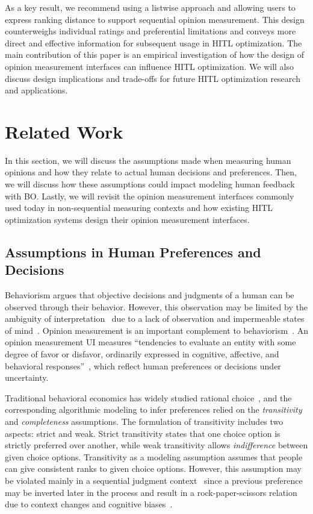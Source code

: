 \documentclass[acmsmall,screen,nonacm]{acmart}
\begin{document}
As a key result, we recommend using a listwise approach and allowing users to express ranking distance to support sequential opinion measurement. This design counterweighs individual ratings and preferential limitations and conveys more direct and effective information for subsequent usage in HITL optimization.
The main contribution of this paper is an empirical investigation of how the design of opinion measurement interfaces can influence HITL optimization. We will also discuss design implications and trade-offs for future HITL optimization research and applications.

\section{Related Work}
In this section, we will discuss the assumptions made when measuring human opinions and how they relate to actual human decisions and preferences. Then, we will discuss how these assumptions could impact modeling human feedback with BO. Lastly, we will revisit the opinion measurement interfaces commonly used today in non-sequential measuring contexts and how existing HITL optimization systems design their opinion measurement interfaces.

\subsection{Assumptions in Human Preferences and Decisions}
Behaviorism argues that objective decisions and judgments of a human can be observed through their behavior. However, this observation may be limited by the ambiguity of interpretation~\cite{skinner2011about} due to a lack of observation and impermeable states of mind~\cite{overgaard2006the}. Opinion measurement is an important complement to behaviorism~\cite{nobarany2012opinion}. An opinion measurement UI measures ``tendencies to evaluate an entity with some degree of favor or disfavor, ordinarily expressed in cognitive, affective, and behavioral responses''~\cite{eagly1993the}, which reflect human preferences or decisions under uncertainty.

Traditional behavioral economics has widely studied rational choice~\cite{dreier1996rational}, and the corresponding algorithmic modeling to infer preferences relied on the \emph{transitivity} and \emph{completeness} assumptions. The formulation of transitivity includes two aspects: strict and weak. Strict transitivity states that one choice option is strictly preferred over another, while weak transitivity allows \emph{indifference} between given choice options.
%
Transitivity as a modeling assumption assumes that people can give consistent ranks to given choice options. However, this assumption may be violated mainly in a sequential judgment context~\cite{debreu1960individual, bettman1998constructive} since a previous preference may be inverted later in the process and result in a rock-paper-scissors relation due to context changes and cognitive biases~\cite{tversky1974judgment}.
\end{document}
